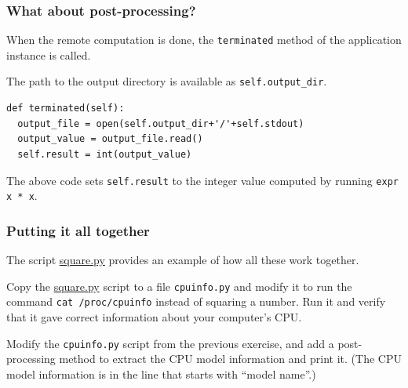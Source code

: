 \documentclass[english,serif,mathserif,xcolor=pdftex,dvipsnames,table]{beamer}
\begin{document}
\begin{frame}[fragile]
\frametitle{What about post-processing?}
\label{sec-11}

When the remote computation is done, the \texttt{terminated} method of
the application instance is called.

\+
The path to the output directory is available as \lstinline|self.output_dir|.

\+
\begin{lstlisting}
def terminated(self):
  output_file = open(self.output_dir+'/'+self.stdout)
  output_value = output_file.read()
  self.result = int(output_value)
\end{lstlisting}

\+
The above code sets \lstinline|self.result| to the integer value computed by
running \texttt{expr x * x}.
\end{frame}


\begin{frame}[fragile]
  \frametitle{Putting it all together}
  
  The script
  \href{http://www.gc3.uzh.ch/teaching/gc3pie2012/square.py}{square.py}
  provides an example of how all these work together.
\end{frame}


\begin{frame}
  \begin{exercise}
    Copy the
    \href{http://www.gc3.uzh.ch/teaching/gc3pie2012/square.py}{square.py}
    script to a file \texttt{cpuinfo.py} and modify it to run the
    command \texttt{cat /proc/cpuinfo} instead of squaring a number.
    Run it and verify that it gave correct information about your computer's CPU.
  \end{exercise}

  \+
  \begin{exercise}
    Modify the \texttt{cpuinfo.py} script from the previous exercise,
    and add a post-processing method to extract the CPU model
    information and print it.  (The CPU model information is in the
    line that starts with ``model name''.)
  \end{exercise}
\end{frame}
\end{document}
